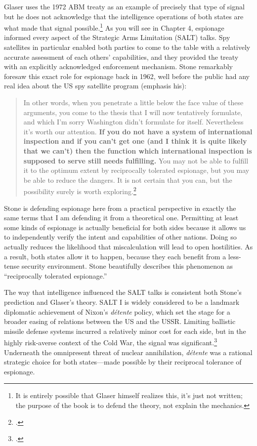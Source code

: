 \documentclass{memoir}
\begin{document}
\begin{refsegment}
Glaser uses the 1972 ABM treaty as an example of precisely that type of signal but he does not acknowledge that the intelligence operations of both states are what made that signal possible.\footnote{It is entirely possible that Glaser himself realizes this, it's just not written; the purpose of the book is to defend the theory, not explain the mechanics.} As you will see in Chapter 4, espionage informed every aspect of the Strategic Arms Limitation (SALT) talks. Spy satellites in particular enabled both parties to come to the table with a relatively accurate assessment of each others' capabilities, and they provided the treaty with an explicitly acknowledged enforcement mechanism. Stone remarkably foresaw this exact role for espionage back in 1962, well before the public had any real idea about the US spy satellite program (emphasis his):

\begin{quote}
In other words, when you penetrate a little below the face value of these arguments, you come to the thesis that I will now tentatively formulate, and which I'm sorry Washington didn't formulate for itself. Nevertheless it's worth our attention. \textbf{If you do not have a system of international inspection and if you can't get one (and I think it is quite likely that we can't) then the function which international inspection is supposed to serve still needs fulfilling.} You may not be able to fulfill it to the optimum extent by reciprocally tolerated espionage, but you may be able to reduce the dangers. It is not certain that you can, but the possibility surely is worth exploring.\footcite[p.~41]{stone_legal_1962}
\end{quote}

Stone is defending espionage here from a practical perspective in exactly the same terms that I am defending it from a theoretical one. Permitting at least some kinds of espionage is actually beneficial for both sides because it allows us to independently verify the intent and capabilities of other nations. Doing so actually reduces the likelihood that miscalculation will lead to open hostilities. As a result, both states allow it to happen, because they each benefit from a less-tense security environment. Stone beautifully describes this phenomenon as ``reciprocally tolerated espionage.''

The way that intelligence influenced the SALT talks is consistent both Stone's prediction and Glaser's theory. SALT I is widely considered to be a landmark diplomatic achievement of Nixon's \emph{d\'etente} policy, which set the stage for a broader easing of relations between the US and the USSR. Limiting ballistic missile defense systems incurred a relatively minor cost for each side, but in the highly risk-averse context of the Cold War, the signal was significant.\footcite[p.~66]{glaser_rational_2010} Underneath the omnipresent threat of nuclear annihilation, \emph{d\'etente} was a rational strategic choice for both states---made possible by their reciprocal tolerance of espionage.


\end{refsegment}
\end{document}
